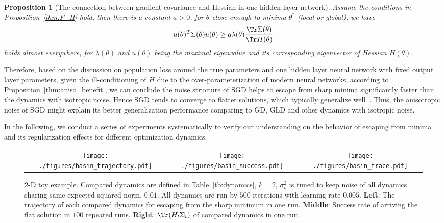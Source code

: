 \documentclass{article}
\newtheorem{proposition}{Proposition}
\begin{document}
\begin{proposition}[The connection between gradient covariance and Hessian in one hidden layer network]
Assume the conditions in Proposition~\ref{thm:F_H} hold, then there is a constant $a >0$, for $\theta$ close enough to minima $\theta^*$ (local or global), we have
\begin{equation}
    u(\theta)^T \Sigma(\theta) u(\theta) \ge a \lambda(\theta) \frac{\Tr \Sigma(\theta)}{\Tr H(\theta)}
\end{equation}
holds almost everywhere, for $\lambda(\theta)$ and $u(\theta)$ being the maximal eigenvalue and its corresponding eigenvector of Hessian $H(\theta)$.
\label{thm:Sigma_H}
\end{proposition}

Therefore, based on the discussion on population loss around the true parameters and one hidden layer neural network with fixed output layer parameters, given the ill-conditioning of $H$ due to the over-parameterization of modern neural networks, according to Proposition~\ref{thm:aniso_benefit}, we can conclude the noise structure of SGD helps to escape from sharp minima significantly faster than the dynamics with isotropic noise.
Hence SGD tends to converge to flatter solutions, which typically generalize well~\citep{hochreiter1997flat,keskar2016large,neyshabur2017,wu2017towards}.
Thus, the anisotropic noise of SGD might explain its better generalization performance comparing to GD, GLD and other dynamics with isotropic noise.%

In the following, we conduct a series of experiments systematically to verify our understanding on the behavior of escaping from minima and its regularization effects for different optimization dynamics.

\begin{figure*}
\centering
\begin{tabular}{ccc}
\texttt{[image: ./figures/basin\_trajectory.pdf]} & \texttt{[image: ./figures/basin\_success.pdf]} & \texttt{[image: ./figures/basin\_trace.pdf]}
\end{tabular}
\vspace{-4mm}
\caption{\small 2-D toy example. Compared dynamics are defined in Table~\ref{tb:dynamics}, $k=2$, $\sigma_t^2$ is tuned to keep noise of all dynamics sharing same expected squared norm, $0.01$.
All dynamics are run by $500$ iterations with learning rate $0.005$.
\textbf{Left}: The trajectory of each compared dynamics for escaping from the sharp minimum in one run.
\textbf{Middle}: Success rate of arriving the flat solution in $100$ repeated runs.
\textbf{Right}: $\Tr(H_t \Sigma_t)$ of compared dynamics in one run.}
\label{fig:2d}
\vspace{-4mm}
\end{figure*}
\end{document}
